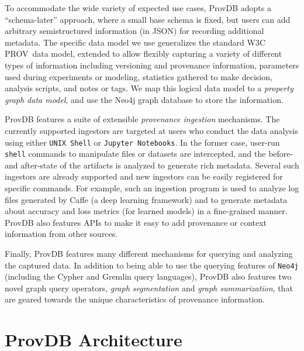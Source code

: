 \documentclass[11pt]{article}
\newcommand{\provdb}{{\sc ProvDB}\xspace}
\newcommand{\prov}{{\sc PROV}\xspace}
\begin{document}
To accommodate the wide variety of expected use cases, \provdb adopts a
``schema-later'' approach, where a small base schema is fixed, but users can add arbitrary semistructured information (in JSON) for recording additional metadata. 
The specific data model we use generalizes the standard W3C \prov\ data model, extended to allow flexibly capturing a variety of different types of information including versioning and provenance
information, parameters used during experiments or modeling, statistics gathered to make decision, analysis scripts, and notes or tags.
We map this logical data model to a {\em property graph data model}, and use the Neo4j graph database to store the information. 

\provdb features a suite of extensible {\em provenance ingestion} mechanisms. The currently supported ingestors are targeted at users who conduct the data
analysis using either {\tt UNIX Shell} or {\tt Jupyter Notebooks}. In the former case, user-run {\tt shell} commands to manipulate files or datasets are intercepted, and 
the before- and after-state of the artifacts is analyzed to generate rich metadata. Several such ingestors are already supported and new ingestors can be easily 
registered for specific commands. For example, such an ingestion program is used to analyze log files generated by Caffe (a deep learning framework) and to generate metadata 
about accuracy and loss metrics (for learned models) in a fine-grained manner. \provdb also features APIs to make it easy to add provenance or context information from other 
sources.

Finally, \provdb features many different mechanisms for querying and analyzing
the captured data. In addition to being able to use the querying features of
{\tt Neo4j} (including the Cypher and Gremlin query languages), \provdb also
features two novel graph query operators, {\em graph segmentation} and {\em
graph summarization}, that are geared towards the unique characteristics of
provenance information. 

\section{ProvDB Architecture}
\label{sec:sys_arch}
\end{document}
